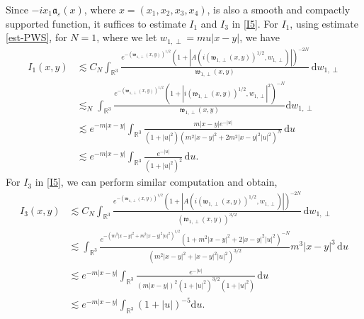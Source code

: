 \documentclass{article}
\newcommand\dela[1]{}
\newcommand{\mathd}{\mathrm{d}}
\begin{document}
Since $- i x_1 \mathfrak{a}_{\varepsilon} (x)$, where $x= (x_1,x_2,x_3,x_4)$,  is also a smooth and compactly supported function, it suffices to estimate $I_1$ and $I_3$ in \eqref{I5}. For $I_1$, using estimate \eqref{est-PWS}, for $N =1$, where we let $w_{1, \perp} = m u | x - y |$, we have 
%
\begin{align}
    I_1 (x, y) & \lesssim  C_N \int_{\mathbb{R}^3} \frac{e^{-
    (\mathfrak{w}_{1, \perp} (x, y))^{1 / 2}} (1 + | A (i (\mathfrak{w}_{1,
    \perp} (x, y))^{1 / 2}, w_{1, \perp}) |)^{- 2 N}}{\mathfrak{w}_{1, \perp}
    (x, y)} \, \mathd w_{1, \perp} \nonumber \\
    & \lesssim_N  \int_{\mathbb{R}^3} \frac{e^{- (\mathfrak{w}_{1, \perp}
    (x, y))^{1 / 2}} (1 + | i (\mathfrak{w}_{1, \perp} (x, y))^{1 / 2}, w_{1,
    \perp} |^2)^{- N}}{\mathfrak{w}_{1, \perp} (x, y)} \mathd w_{1, \perp} \nonumber \\
    \dela{& =  \int_{\mathbb{R}^3} \frac{e^{- \left( m^2 | x - y |^2 + m^2 | x - y
    |^2 |u|^2  \right)^{1 / 2}} (1 + m^2 | x - y |^2 + 2 | x -
    y |^2 | u |^2)^{- N}}{m^2 | x - y |^2 + m^2 | x - y |^2 {| u |^2} } m^3 |
    x - y |^3 \mathd u  \quad \nonumber\\}
    & \lesssim  e^{- m | x - y |} \int_{\mathbb{R}^3} \frac{m | x - y | e^{-
    | u |}}{\left( 1 + |u|^2  \right) (m^2 | x - y |^2 + 2 m^2
    | x - y |^2 | u |^2)^N} \, \mathd u \nonumber \\
    & \lesssim e^{- m | x - y |} \int_{\mathbb{R}^3} \frac{e^{- |u |}}{\left( 1 + | u|^2 \right)^2} \, \mathd u. 
  \label{I6}
\end{align}
%
For $I_3$ in \eqref{I5},  we can perform similar computation and obtain, 
\begin{align}
    I_3 (x, y) & \lesssim  C_N \int_{\mathbb{R}^3} \frac{e^{-
    (\mathfrak{w}_{1, \perp} (x, y))^{1 / 2}} (1 + | A (i (\mathfrak{w}_{1,
    \perp} (x, y))^{1 / 2}, w_{1, \perp}) |)^{- 2 N}}{(\mathfrak{w}_{1, \perp}
    (x, y))^{3 / 2}} \,  \mathd w_{1, \perp} \nonumber\\
    & \lesssim  \int_{\mathbb{R}^3} \frac{e^{- \left( m^2 | x - y |^2 + m^2
    | x - y |^2 | u |^2  \right)^{1 / 2}} (1 + m^2 | x - y |^2 +
    2 | x - y |^2 | u |^2)^{- N}}{\left( m^2 | x - y |^2 + | x - y |^2 |
    u|^2  \right)^{3 / 2}} m^3 | x - y |^3 \, \mathd u  \nonumber \\
%
    & \lesssim  e^{- m | x - y |} \int_{\mathbb{R}^3} \frac{e^{- | u |}}{(m
    | x - y |)^2 \left( 1 + | u |^2  \right)^{3 / 2} (1 + | u
    |^2)} \, \mathd u \nonumber \\
    & \lesssim  e^{- m | x - y |}\int_{\mathbb{R}^3} (1 + | u | )^{- 5} \mathd u . 
  \label{I7}
\end{align}
\end{document}
